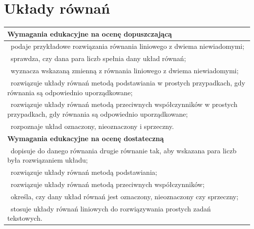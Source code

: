 \documentclass[12pt,a4paper]{article}
\begin{document}
	\section{Układy równań}
	
	\begin{longtable}{|p{16cm}|}
		\hline
		
		\textbf{Wymagania edukacyjne na ocenę dopuszczającą} \\ \hline
		
		\textbullet\ podaje przykładowe rozwiązania równania liniowego z dwiema niewiadomymi; \\
		
		\textbullet\ sprawdza, czy dana para liczb spełnia dany układ równań; \\
		
		\textbullet\ wyznacza wskazaną zmienną z równania liniowego z dwiema niewiadomymi; \\
		
		\textbullet\ rozwiązuje układy równań metodą podstawiania w prostych przypadkach, gdy równania są odpowiednio uporządkowane; \\
		
		\textbullet\ rozwiązuje układy równań metodą przeciwnych współczynników w prostych przypadkach, gdy równania są odpowiednio uporządkowane; \\
		
		\textbullet\ rozpoznaje układ oznaczony, nieoznaczony i sprzeczny. \\ \hline
		
		\textbf{Wymagania edukacyjne na ocenę dostateczną} \\ \hline
		
		\textbullet\ dopisuje do danego równania drugie równanie tak, aby wskazana para liczb była rozwiązaniem układu; \\
		
		\textbullet\ rozwiązuje układy równań metodą podstawiania; \\
		
		\textbullet\ rozwiązuje układy równań metodą przeciwnych współczynników; \\
		
		\textbullet\ określa, czy dany układ równań jest oznaczony, nieoznaczony czy sprzeczny; \\
		
		\textbullet\ stosuje układy równań liniowych do rozwiązywania prostych zadań tekstowych. \\ \hline
		

\end{longtable}
\end{document}
